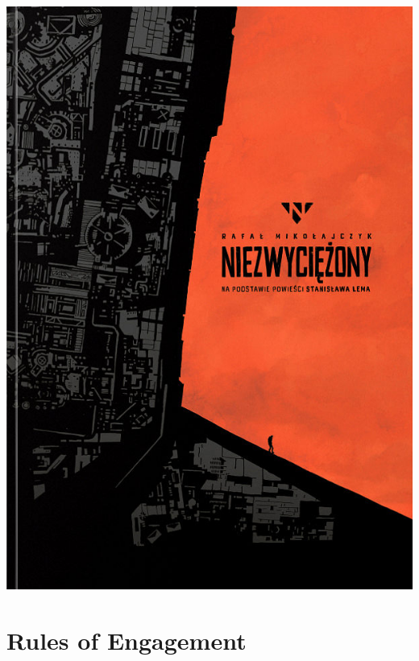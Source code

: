 \documentclass{beamer}
\begin{document}
\begin{frame}
{\begin{center}
            \includegraphics[width = .5\textwidth]{niezwyciezony.jpeg}
        \end{center}
    }

\end{frame}

\section{Rules of Engagement}
\end{document}
